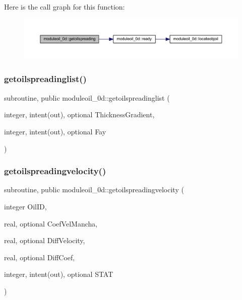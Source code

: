 Here is the call graph for this function\+:\nopagebreak
\begin{figure}[H]
\begin{center}
\leavevmode
\includegraphics[width=350pt]{namespacemoduleoil__0d_af99e71581dc3e88eb79bbabd1712077d_cgraph}
\end{center}
\end{figure}
\mbox{\label{namespacemoduleoil__0d_af81162169a4b962122c4de881bf62957}} 
\subsubsection{\texorpdfstring{getoilspreadinglist()}{getoilspreadinglist()}}
{\footnotesize\ttfamily subroutine, public moduleoil\+\_\+0d\+::getoilspreadinglist (\begin{DoxyParamCaption}\item[{integer, intent(out), optional}]{Thickness\+Gradient,  }\item[{integer, intent(out), optional}]{Fay }\end{DoxyParamCaption})}

\mbox{\label{namespacemoduleoil__0d_a2eecd31ffeaa8edcf98841c8c93d7fb2}} 
\subsubsection{\texorpdfstring{getoilspreadingvelocity()}{getoilspreadingvelocity()}}
{\footnotesize\ttfamily subroutine, public moduleoil\+\_\+0d\+::getoilspreadingvelocity (\begin{DoxyParamCaption}\item[{integer}]{Oil\+ID,  }\item[{real, optional}]{Coef\+Vel\+Mancha,  }\item[{real, optional}]{Diff\+Velocity,  }\item[{real, optional}]{Diff\+Coef,  }\item[{integer, intent(out), optional}]{S\+T\+AT }\end{DoxyParamCaption})}


